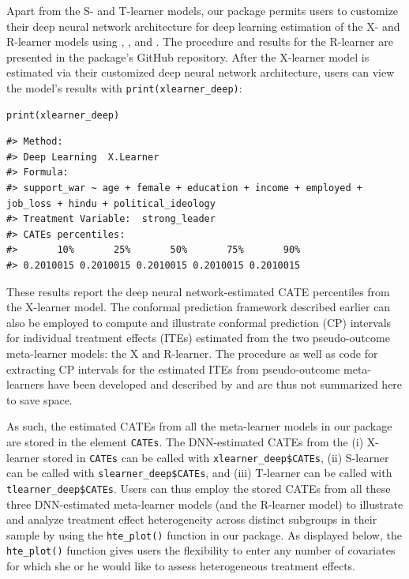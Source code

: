 Apart from the S- and T-learner models, our package permits users to
customize their deep neural network architecture for deep learning
estimation of the X- and R-learner models using ,
, and . The procedure and results for the
R-learner are presented in the package's GitHub repository. After the
X-learner model is estimated via their customized deep neural network
architecture, users can view the model's results with
\texttt{print(xlearner\_deep)}:

\begin{verbatim}
print(xlearner_deep)
\end{verbatim}

\begin{verbatim}
#> Method:
#> Deep Learning  X.Learner
#> Formula:
#> support_war ~ age + female + education + income + employed +      job_loss + hindu + political_ideology
#> Treatment Variable:  strong_leader
#> CATEs percentiles:
#>       10%       25%       50%       75%       90% 
#> 0.2010015 0.2010015 0.2010015 0.2010015 0.2010015
\end{verbatim}

These results report the deep neural network-estimated CATE percentiles
from the X-learner model. The conformal prediction framework described
earlier can also be employed to compute and illustrate conformal
prediction (CP) intervals for individual treatment effects (ITEs)
estimated from the two pseudo-outcome meta-learner models: the X and
R-learner. The procedure as well as code for extracting CP intervals for
the estimated ITEs from pseudo-outcome meta-learners have been developed
and described by \citet{Alaa2023conformal} and are thus not summarized here to
save space.

As such, the estimated CATEs from all the meta-learner models in our
package are stored in the element \texttt{CATEs}. The DNN-estimated CATEs from
the (i) X-learner stored in \texttt{CATEs} can be called with
\texttt{xlearner\_deep\$CATEs}, (ii) S-learner can be called with
\texttt{slearner\_deep\$CATEs}, and (iii) T-learner can be called with
\texttt{tlearner\_deep\$CATEs}. Users can thus employ the stored CATEs from all
these three DNN-estimated meta-learner models (and the R-learner model)
to illustrate and analyze treatment effect heterogeneity across distinct
subgroups in their sample by using the \texttt{hte\_plot()} function in our
package. As displayed below, the \texttt{hte\_plot()} function gives users the
flexibility to enter any number of covariates for which she or he would
like to assess heterogeneous treatment effects.

